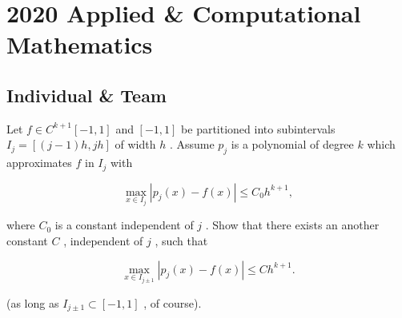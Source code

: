 \section{2020 Applied \& Computational Mathematics}

\subsection{Individual \& Team}

\begin{exercise}
\label{applied:2020:1}
Let $f \in C ^ { k + 1 } [ - 1 , 1 ]$ and $[ - 1 , 1 ]$ be partitioned into subintervals $I _ { j } = [ ( j - 1 ) h , j h ]$ of width $h$ . Assume $p_{j}$ is a polynomial of degree $k$ which approximates $f$ in $I_{j}$ with

\[
\max  _ {x \in I _ {j}} \left| p _ {j} (x) - f (x) \right| \leq C _ {0} h ^ {k + 1},
\]

where $C _ { 0 }$ is a constant independent of $j$ . Show that there exists an another constant $C$ , independent of $j$ , such that

\[
\max  _ {x \in I _ {j \pm 1}} \left| p _ {j} (x) - f (x) \right| \leq C h ^ {k + 1}.
\]

(as long as $I _ { j \pm 1 } \subset [ - 1 , 1 ]$ , of course).
\end{exercise}

